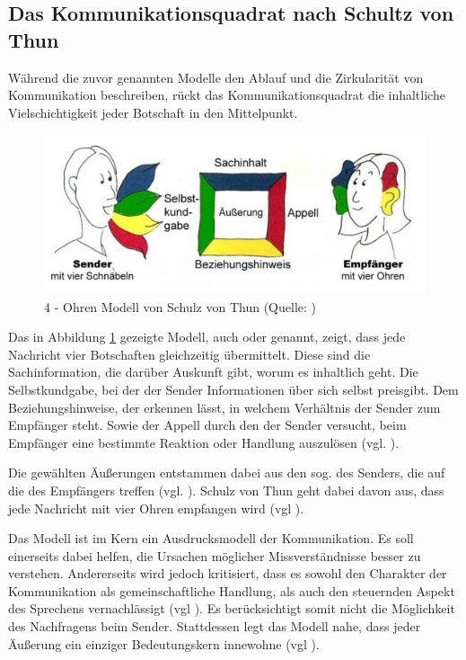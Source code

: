 \subsection{Das Kommunikationsquadrat nach Schultz von Thun}
Während die zuvor genannten Modelle den Ablauf und die Zirkularität von Kommunikation beschreiben, rückt das Kommunikationsquadrat die inhaltliche Vielschichtigkeit jeder Botschaft in den Mittelpunkt.

\begin{figure}[ht]
\centering
\includegraphics[width=1\linewidth]{content/pictures/Kommunikationsquadrat.PNG}
\caption{4 - Ohren Modell von Schulz von Thun (Quelle: \citealp{noauthor_kommunikationsquadrat_nodate})}
\label{fig:four-ears}
\end{figure}

Das in Abbildung \ref{fig:four-ears} gezeigte Modell, auch  oder  genannt, zeigt, dass jede Nachricht vier Botschaften gleichzeitig übermittelt. Diese sind die Sachinformation, die darüber Auskunft gibt, worum es inhaltlich geht. Die Selbstkundgabe, bei der der Sender Informationen über sich selbst preisgibt. Dem Beziehungshinweise, der erkennen lässt, in welchem Verhältnis der Sender zum Empfänger steht. Sowie der Appell durch den der Sender versucht, beim Empfänger eine bestimmte Reaktion oder Handlung auszulösen (vgl. \citealp{noauthor_kommunikationsquadrat_nodate}).

Die gewählten Äußerungen entstammen dabei aus den sog.  des Senders, die auf die  des Empfängers treffen (vgl. \citealp{noauthor_kommunikationsquadrat_nodate}). Schulz von Thun geht dabei davon aus, dass jede Nachricht mit vier Ohren empfangen wird (vgl \citealp[S. 23]{becker_praxishandbuch_2018}). 

Das Modell ist im Kern ein Ausdrucksmodell der Kommunikation. Es soll einerseits dabei helfen, die Ursachen möglicher Missverständnisse besser zu verstehen. Andererseits wird jedoch kritisiert, dass es sowohl den Charakter der Kommunikation als gemeinschaftliche Handlung, als auch den steuernden Aspekt des Sprechens vernachlässigt (vgl \citealp[S. 23]{becker_praxishandbuch_2018}). Es berücksichtigt somit nicht die Möglichkeit des Nachfragens beim Sender. Stattdessen legt das Modell nahe, dass jeder Äußerung ein einziger  Bedeutungskern innewohne (vgl \citealp[S. 23]{becker_praxishandbuch_2018}). 

